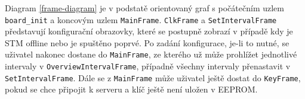 Diagram \ref{frame-diagram} je v podstatě orientovaný graf s počátečním uzlem \texttt{board\_init}
a koncovým uzlem \texttt{MainFrame}.
\texttt{ClkFrame} a \texttt{SetIntervalFrame} představují konfigurační obrazovky, které se postupně
zobrazí v případě kdy je STM offline nebo je spuštěno poprvé.
Po zadání konfigurace, je-li to nutné, se uživatel nakonec dostane do \texttt{MainFrame}, ze kterého
už může prohlížet jednotlivé intervaly v \texttt{OverviewIntervalFrame}, případně všechny intervaly
přenastavit v \texttt{SetIntervalFrame}.
Dále se z \texttt{MainFrame} může uživatel ještě dostat do \texttt{KeyFrame}, pokud se chce připojit
k serveru a klíč ještě není uložen v EEPROM.


